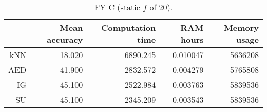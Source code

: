 \begin{table}[h]
\centering
\begin{tabular}{r|rrrr}
    & Mean accuracy & Computation time & RAM hours & Memory usage \\ \hline
kNN & 18.020                   & 6890.245         & 0.010047  & 5636208      \\
AED & 41.900                   & 2832.572         & 0.004279  & 5765808      \\
IG  & 45.100                   & 2522.984         & 0.003763  & 5839536      \\
SU  & 45.100                   & 2345.209         & 0.003543  & 5839536     
\end{tabular}
\caption{FY C (static $f$ of 20).}
\label{Table:FY_C}
\end{table}